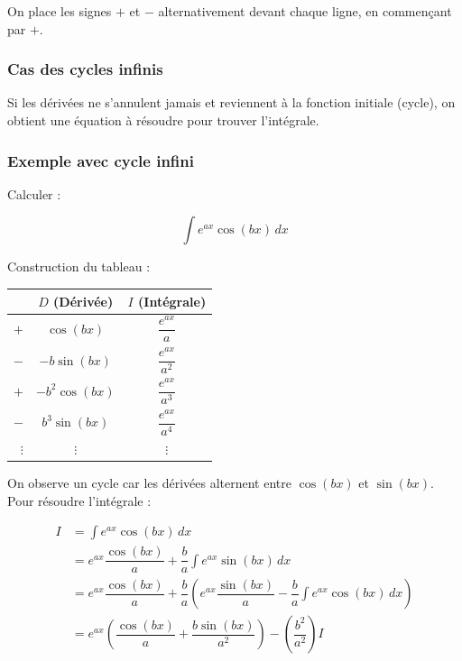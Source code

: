 On place les signes $+$ et $-$ alternativement devant chaque ligne, en commençant par $+$.

\subsubsection*{Cas des cycles infinis}

Si les dérivées ne s'annulent jamais et reviennent à la fonction initiale (cycle), on obtient une équation à résoudre pour trouver l'intégrale.

\subsubsection*{Exemple avec cycle infini}

Calculer :

\begin{equation}
    \int e^{ax} \cos(bx) \, dx
\end{equation}

Construction du tableau :

\begin{center}
\begin{tabular}{r|c|c}
    & $D$ (Dérivée) & $I$ (Intégrale) \\
    \hline
    $+$ & $\cos(bx)$          & $\dfrac{e^{ax}}{a}$ \\
    $-$ & $-b\sin(bx)$        & $\dfrac{e^{ax}}{a^2}$ \\
    $+$ & $-b^2\cos(bx)$      & $\dfrac{e^{ax}}{a^3}$ \\
    $-$ & $b^3\sin(bx)$       & $\dfrac{e^{ax}}{a^4}$ \\
    $\vdots$ & $\vdots$       & $\vdots$
\end{tabular}
\end{center}

On observe un cycle car les dérivées alternent entre $\cos(bx)$ et $\sin(bx)$. Pour résoudre l'intégrale :

\begin{align*}
    I &= \int e^{ax} \cos(bx) \, dx \\
    &= e^{ax} \dfrac{\cos(bx)}{a} + \dfrac{b}{a} \int e^{ax} \sin(bx) \, dx \\
    &= e^{ax} \dfrac{\cos(bx)}{a} + \dfrac{b}{a} \left( e^{ax} \dfrac{\sin(bx)}{a} - \dfrac{b}{a} \int e^{ax} \cos(bx) \, dx \right) \\
    &= e^{ax} \left( \dfrac{\cos(bx)}{a} + \dfrac{b \sin(bx)}{a^2} \right) - \left( \dfrac{b^2}{a^2} \right) I
\end{align*}

